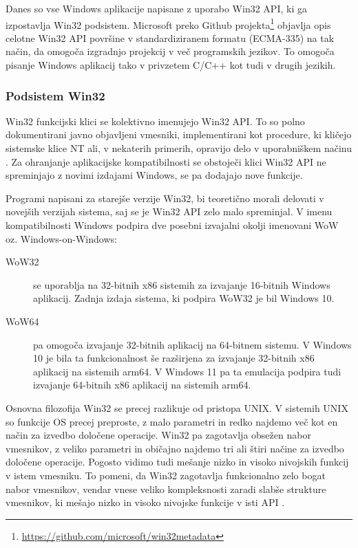 \documentclass[a4paper,12pt,openright]{book}
\begin{document}
Danes so vse Windows aplikacije napisane z uporabo Win32 API, ki ga izpostavlja Win32 podsistem.
Microsoft preko Github projekta\footnote{\url{https://github.com/microsoft/win32metadata}} objavlja opis celotne Win32 API površine v standardiziranem formatu (ECMA-335) na tak način, da omogoča izgradnjo projekcij v več programskih jezikov.
To omogoča pisanje Windows aplikacij tako v privzetem C/C++ kot tudi v drugih jezikih.

\subsubsection{Podsistem Win32}

Win32 funkcijski klici se kolektivno imenujejo Win32 API.
To so polno dokumentirani javno objavljeni vmesniki, implementirani kot procedure, ki kličejo sistemske klice NT ali, v nekaterih primerih, opravijo delo v uporabniškem načinu \cite{Tanenbaum_Bos_2023}.
Za ohranjanje aplikacijske kompatibilnosti se obstoječi klici Win32 API ne spreminjajo z novimi izdajami Windows, se pa dodajajo nove funkcije.

Programi napisani za starejše verzije Win32, bi teoretično morali delovati v novejših verzijah sistema, saj se je Win32 API zelo malo spreminjal.
V imenu kompatibilnosti Windows podpira dve posebni izvajalni okolji imenovani WoW oz. Windows-on-Windows:
\begin{description}
	\item[WoW32] se uporablja na 32-bitnih x86 sistemih za izvajanje 16-bitnih Windows aplikacij. Zadnja izdaja sistema, ki podpira WoW32 je bil Windows 10.
	\item[WoW64] pa omogoča izvajanje 32-bitnih aplikacij na 64-bitnem sistemu.
	V Windows 10 je bila ta funkcionalnost še razširjena za izvajanje 32-bitnih x86 aplikacij na sistemih arm64.
	V Windows 11 pa ta emulacija podpira tudi izvajanje 64-bitnih x86 aplikacij na sistemih arm64.
\end{description}

Osnovna filozofija Win32 se precej razlikuje od pristopa UNIX.
V sistemih UNIX so funkcije OS precej preproste, z malo parametri in redko najdemo več kot en način za izvedbo določene operacije.
Win32 pa zagotavlja obsežen nabor vmesnikov, z veliko parametri in običajno najdemo tri ali štiri načine za izvedbo določene operacije.
Pogosto vidimo tudi mešanje nizko in visoko nivojskih funkcij v istem vmesniku.
To pomeni, da Win32 zagotavlja funkcionalno zelo bogat nabor vmesnikov, vendar vnese veliko kompleksnosti zaradi slabše strukture vmesnikov, ki mešajo nizko in visoko nivojske funkcije v isti API \cite{Tanenbaum_Bos_2023}.
\end{document}
